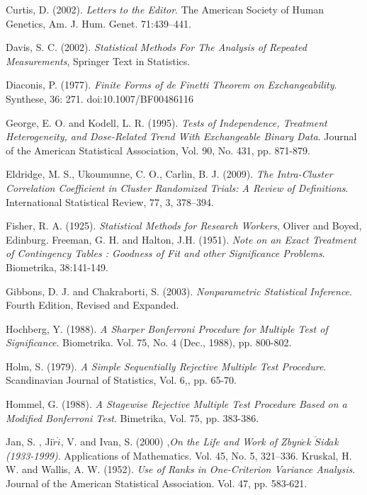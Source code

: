 \documentclass[12pt,oneside]{report}
\theoremstyle{definition}
\theoremstyle{mystyle}
\begin{document}
\begin{thebibliography}{99}
Curtis, D. (2002). \emph{Letters to the Editor}. The American Society of Human Genetics, Am. J. Hum. Genet. 71:439–441.

Davis, S. C. (2002). \emph{Statistical Methods For The  Analysis of Repeated Measurements}, Springer Text in Statistics.

Diaconis, P.  (1977). \emph{Finite Forms of de Finetti Theorem on Exchangeability}. Synthese, 36: 271. doi:10.1007/BF00486116




George, E. O. and  Kodell, L. R. (1995). \emph{Tests of Independence, Treatment Heterogeneity, and Dose-Related Trend With Exchangeable
	Binary Data}. Journal of the American Statistical Association, Vol. 90, No. 431, pp. 871-879.

Eldridge, M. S., Ukoumunne, C. O., Carlin, B. J. (2009).  \emph{The Intra-Cluster Correlation Coefficient in Cluster Randomized Trials: A Review	of Definitions}. International Statistical Review, 77, 3, 378–394.

Fisher, R. A. (1925). \emph{Statistical Methods for Research Workers}, Oliver and Boyed, Edinburg.
Freeman, G. H. and  Halton, J.H. (1951). \emph{Note on an Exact Treatment of Contingency Tables : Goodness of Fit and other Significance Problems}. Biometrika, 38:141-149.

Gibbons, D. J. and  Chakraborti, S. (2003). \emph{Nonparametric Statistical Inference}. Fourth Edition, Revised and Expanded.

Hochberg, Y. (1988). \emph{A Sharper Bonferroni Procedure for Multiple Test of Significance}. Biometrika. Vol. 75, No. 4 (Dec., 1988), pp. 800-802.


Holm, S. (1979). \emph{A Simple Sequentially Rejective Multiple Test Procedure}. Scandinavian Journal of Statistics, Vol. 6,, pp. 65-70.

Hommel, G. (1988). \emph{A Stagewise Rejective Multiple Test Procedure Based on a Modified Bonferroni Test}. Bimetrika, Vol. 75, pp. 383-386.


Jan, S. , Ji$\check{r}\acute{i}$, V. and Ivan, S.  (2000) ,\emph{On the Life and Work of Zbyn$\acute{e}$k $\check{S}$id$\check{a}$k (1933-1999)}. Applications of Mathematics. Vol. 45, No. 5, 321--336.
Kruskal, H. W. and Wallis, A. W. (1952). \emph{Use of Ranks in One-Criterion Variance Analysis}. Journal of the American Statistical Association. Vol. 47, pp. 583-621.



\end{thebibliography}
\end{document}
